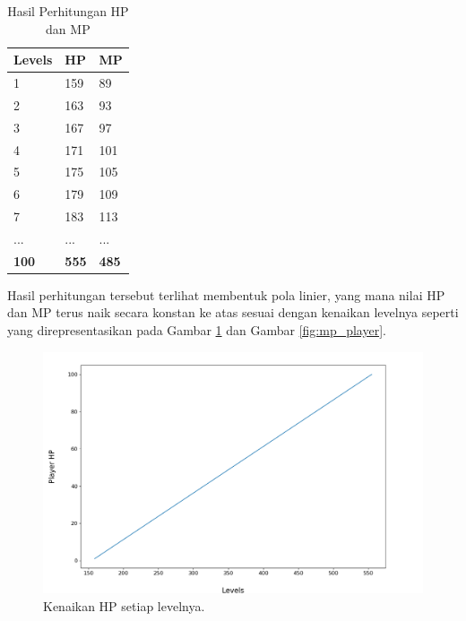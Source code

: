 \begin{longtable}{|l|l|l|}
	\caption{Hasil Perhitungan HP dan MP}
	\label{tb:player_hp_mp}\\
	\hline
	\rowcolor[HTML]{C0C0C0} 
	\textbf{Levels} & \textbf{HP} & \textbf{MP} \\ \hline
	1 & 159 & 89 \\ \hline
	2 & 163 & 93 \\ \hline
	3 & 167 & 97 \\ \hline
	4 & 171 & 101 \\ \hline
	5 & 175 & 105 \\ \hline
	6 & 179 & 109 \\ \hline
	7 & 183 & 113 \\ \hline
	... & ... & ... \\ \hline
	\textbf{100} & \textbf{555} & \textbf{485} \\ \hline
\end{longtable}
\vspace{1ex}

Hasil perhitungan tersebut terlihat membentuk pola linier, yang mana nilai HP dan MP terus naik secara konstan ke atas sesuai dengan kenaikan levelnya seperti yang direpresentasikan pada Gambar \ref{fig:hp_player} dan Gambar \ref{fig:mp_player}.

\begin{figure} [!h] \centering
	\includegraphics[scale=0.45]{img/PlayerHpDistrib.png}
	\caption{Kenaikan HP setiap levelnya.}
	\label{fig:hp_player}
\end{figure}

